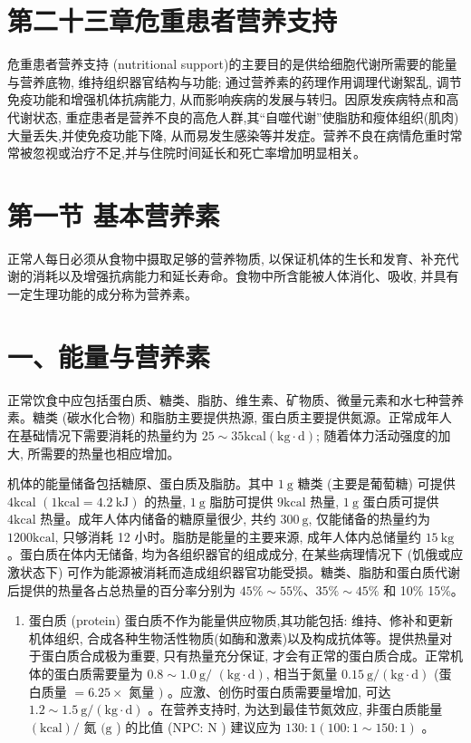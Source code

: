 \documentclass[10pt]{article}
\begin{document}
\section*{第二十三章危重患者营养支持}
危重患者营养支持 (nutritional support)的主要目的是供给细胞代谢所需要的能量与营养底物, 维持组织器官结构与功能; 通过营养素的药理作用调理代谢絮乱, 调节免疫功能和增强机体抗病能力, 从而影响疾病的发展与转归。因原发疾病特点和高代谢状态, 重症患者是营养不良的高危人群,其“自噬代谢”使脂肪和瘦体组织(肌肉)大量丢失,并使免疫功能下降, 从而易发生感染等并发症。营养不良在病情危重时常常被忽视或治疗不足,并与住院时间延长和死亡率增加明显相关。

\section*{第一节 基本营养素}
正常人每日必须从食物中摄取足够的营养物质, 以保证机体的生长和发育、补充代谢的消耗以及增强抗病能力和延长寿命。食物中所含能被人体消化、吸收, 并具有一定生理功能的成分称为营养素。

\section*{一、能量与营养素}
正常饮食中应包括蛋白质、糖类、脂肪、维生素、矿物质、微量元素和水七种营养素。糖类 (碳水化合物) 和脂肪主要提供热源, 蛋白质主要提供氮源。正常成年人在基础情况下需要消耗的热量约为 $25 \sim 35 \mathrm{kcal}(\mathrm{kg} \cdot \mathrm{d})$; 随着体力活动强度的加大, 所需要的热量也相应增加。

机体的能量储备包括糖原、蛋白质及脂肪。其中 $1 \mathrm{~g}$ 糖类 (主要是葡萄糖) 可提供 $4 \mathrm{kcal}$ $(1 \mathrm{kcal}=4.2 \mathrm{~kJ})$ 的热量, $1 \mathrm{~g}$ 脂肪可提供 $9 \mathrm{kcal}$ 热量, $1 \mathrm{~g}$ 蛋白质可提供 $4 \mathrm{kcal}$ 热量。成年人体内储备的糖原量很少, 共约 $300 \mathrm{~g}$, 仅能储备的热量约为 $1200 \mathrm{kcal}$, 只够消耗 12 小时。脂肪是能量的主要来源, 成年人体内总储量约 $15 \mathrm{~kg}$ 。蛋白质在体内无储备, 均为各组织器官的组成成分, 在某些病理情况下 (饥俄或应激状态下) 可作为能源被消耗而造成组织器官功能受损。糖类、脂肪和蛋白质代谢后提供的热量各占总热量的百分率分别为 $45 \% \sim 55 \% 、 35 \% \sim 45 \%$ 和 10\% 15\%。

\begin{enumerate}
  \item 蛋白质 (protein) 蛋白质不作为能量供应物质,其功能包括: 维持、修补和更新机体组织, 合成各种生物活性物质(如酶和激素)以及构成抗体等。提供热量对于蛋白质合成极为重要, 只有热量充分保证, 才会有正常的蛋白质合成。正常机体的蛋白质需要量为 $0.8 \sim 1.0 \mathrm{~g} /$ $(\mathrm{kg} \cdot \mathrm{d})$, 相当于氮量 $0.15 \mathrm{~g} /(\mathrm{kg} \cdot \mathrm{d})$ (蛋白质量 $=6.25 \times$ 氮量 $)$ 。应激、创伤时蛋白质需要量增加, 可达 $1.2 \sim 1.5 \mathrm{~g} /(\mathrm{kg} \cdot \mathrm{d})$ 。在营养支持时, 为达到最佳节氮效应, 非蛋白质能量 $(\mathrm{kcal}) /$ 氮 $(\mathrm{g}$ ) 的比值 (NPC: $\mathrm{N}$ ) 建议应为 $130: 1(100: 1 \sim 150: 1)$ 。
\end{enumerate}
\end{document}
